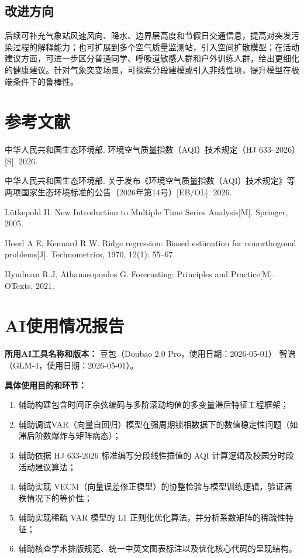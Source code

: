\documentclass[UTF8,a4paper,12pt]{ctexart}
\begin{document}
\subsection{改进方向}

后续可补充气象站风速风向、降水、边界层高度和节假日交通信息，提高对突发污染过程的解释能力；也可扩展到多个空气质量监测站，引入空间扩散模型；在活动建议方面，可进一步区分普通同学、呼吸道敏感人群和户外训练人群，给出更细化的健康建议。针对气象突变场景，可探索分段建模或引入非线性项，提升模型在极端条件下的鲁棒性。

\section{参考文献}

\begin{enumerate}[label={[\arabic*]}]
  \item 中华人民共和国生态环境部. 环境空气质量指数（AQI）技术规定（HJ 633--2026）[S]. 2026.
  \item 中华人民共和国生态环境部. 关于发布《环境空气质量指数（AQI）技术规定》等两项国家生态环境标准的公告（2026年第14号）[EB/OL]. 2026.
  \item Lütkepohl H. New Introduction to Multiple Time Series Analysis[M]. Springer, 2005.
  \item Hoerl A E, Kennard R W. Ridge regression: Biased estimation for nonorthogonal problems[J]. Technometrics, 1970, 12(1): 55--67.
  \item Hyndman R J, Athanasopoulos G. Forecasting: Principles and Practice[M]. OTexts, 2021.
\end{enumerate}

\section*{AI使用情况报告}

\noindent\textbf{所用AI工具名称和版本：} 
豆包（Doubao 2.0 Pro，使用日期：2026-05-01）
智谱（GLM-4，使用日期：2026-05-01）。

\noindent\textbf{具体使用目的和环节：}
\begin{enumerate}[label=(\arabic*),leftmargin=2em]
\item 辅助构建包含时间正余弦编码与多阶滚动均值的多变量滞后特征工程框架；
\item 辅助调试VAR（向量自回归）模型在强周期锁相数据下的数值稳定性问题（如滞后阶数爆炸与矩阵病态）；
\item 辅助依据 HJ 633-2026 标准编写分段线性插值的 AQI 计算逻辑及校园分时段活动建议算法；
\item 辅助实现 VECM（向量误差修正模型）的协整检验与模型训练逻辑，验证满秩情况下的等价性；
\item 辅助实现稀疏 VAR 模型的 L1 正则化优化算法，并分析系数矩阵的稀疏性特征；
\item 辅助核查学术排版规范、统一中英文图表标注以及优化核心代码的呈现结构。
\end{enumerate}
\end{document}
